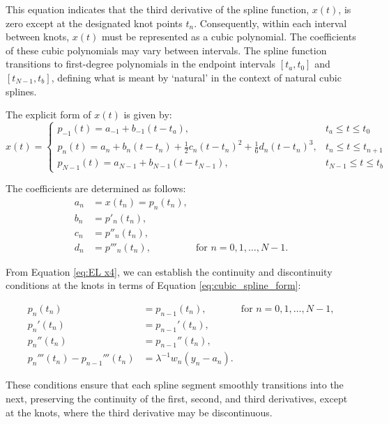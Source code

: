 \documentclass[
11pt, %
oneside, %
english, %
singlespacing, %
]{macthesis} %
\begin{document}
This equation indicates that the third derivative of the spline function, \(x(t)\), is zero except at the designated knot points \(t_n\). Consequently, within each interval between knots, \(x(t)\) must be represented as a cubic polynomial. The coefficients of these cubic polynomials may vary between intervals. The spline function transitions to first-degree polynomials in the endpoint intervals \([t_a, t_0]\) and \([t_{N-1}, t_b]\), defining what is meant by `natural' in the context of natural cubic splines.

The explicit form of \(x(t)\) is given by:
\begin{equation}
x(t) = 
\begin{cases} 
p_{-1}(t) = a_{-1} + b_{-1}(t - t_a), & t_a \leq t \leq t_0 \\
p_n(t) = a_n + b_n(t - t_n) + \frac{1}{2} c_n(t - t_n)^2 + \frac{1}{6} d_n(t - t_n)^3, & t_n \leq t \leq t_{n+1} \\
p_{N-1}(t) = a_{N-1} + b_{N-1}(t - t_{N-1}), & t_{N-1} \leq t \leq t_b
\end{cases}
\label{eq:cubic_spline_form}
\end{equation}

The coefficients are determined as follows:
\[
\begin{aligned}
a_n &= x(t_n) = p_n(t_n), \\
b_n &= p'_n(t_n), \\
c_n &= p''_n(t_n), \\
d_n &= p'''_n(t_n), & \text{for } n = 0, 1, \ldots, N-1.
\end{aligned}
\]

From Equation \ref{eq:EL x4}, we can establish the continuity and discontinuity conditions at the knots in terms of Equation \ref{eq:cubic_spline_form}:

\begin{equation}
\begin{aligned}
p_n(t_n) &= p_{n-1}(t_n), & \text{for } n = 0, 1, \ldots, N-1, \\
p_n'(t_n) &= p_{n-1}'(t_n), \\
p_n''(t_n) &= p_{n-1}''(t_n), \\
p_n'''(t_n) - p_{n-1}'''(t_n) &= \lambda^{-1} w_n (y_n - a_n).
\end{aligned}
\label{eq:continuity_conditions}
\end{equation}

These conditions ensure that each spline segment smoothly transitions into the next, preserving the continuity of the first, second, and third derivatives, except at the knots, where the third derivative may be discontinuous.
\end{document}
